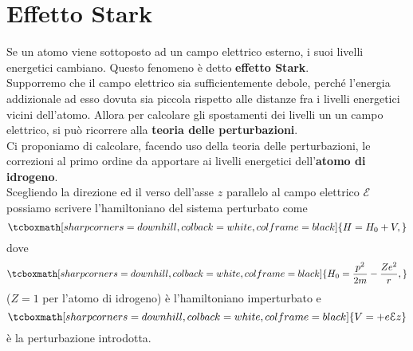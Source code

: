 \documentclass[a4paper,12pt,oneside]{book}
\newcommand*{\myfont}{\fontfamily{ppl}\selectfont}
\begin{document}
\fancypagestyle{plain}{%
\fancyhf{} %
\fancyfoot[C]{\bfseries \myfont{\thepage}} %
\renewcommand{\headrulewidth}{0pt}
\renewcommand{\footrulewidth}{0pt}}

\fancypagestyle{VS}{
\headheight = 15pt
\lhead[\myfont{\textit{\textbf{\thechapter\nouppercase{\leftmark}}}}]{\myfont{\textit{\textbf{\nouppercase{\leftmark}}}}}
\chead[]{}
\rhead[\myfont{\textbf{\thepage}}]{\myfont{\textbf{\thepage}}}

\lfoot[]{}
\cfoot[]{}
\rfoot[]{}
}



\pagestyle{VS}
\setcounter{chapter}{22}
\setcounter{page}{227}
\chapter[Effetto Stark]{Effetto Stark}
Se un atomo viene sottoposto ad un campo elettrico esterno, i suoi livelli energetici cambiano. Questo fenomeno è detto \textbf{effetto Stark}.\\

Supporremo che il campo elettrico sia sufficientemente debole, perché l'energia addizionale ad esso dovuta sia piccola rispetto alle distanze fra i livelli energetici vicini dell'atomo. Allora per calcolare gli spostamenti dei livelli un un campo elettrico, si può ricorrere alla \textbf{teoria delle perturbazioni}.\\

Ci proponiamo di calcolare, facendo uso della teoria delle perturbazioni, le correzioni al primo ordine da apportare ai livelli energetici dell'\textbf{atomo di idrogeno}.\\

Scegliendo la direzione ed il verso dell'asse $z$ parallelo al campo elettrico $\mathcal{E}$ possiamo scrivere l'hamiltoniano del sistema perturbato come
	\begin{equation}
		\tcboxmath[sharp corners=downhill, colback=white, colframe=black]{
			H=H_0+V, 
			}
	\end{equation}
dove
	\begin{equation}
		\tcboxmath[sharp corners=downhill, colback=white, colframe=black]{
			H_0=\frac{p^2}{2m}-\frac{Ze^2}{r},
			}
	\end{equation}
($Z=1$ per l'atomo di idrogeno) è l'hamiltoniano imperturbato e
	\begin{equation}
		\tcboxmath[sharp corners=downhill, colback=white, colframe=black]{
			V=+e\mathcal{E}z
			}
	\end{equation}
è la perturbazione introdotta.\\
\end{document}
